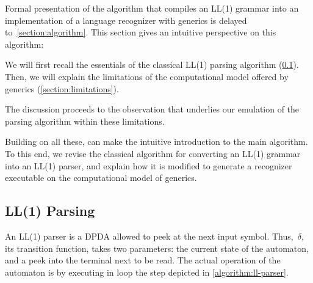 Formal presentation of the algorithm that compiles an LL(1) grammar into an implementation of a
  language recognizer with \Java generics
  is delayed to~\cref{section:algorithm}.
This section gives an intuitive perspective on this algorithm:

We will first recall the essentials of the classical LL(1) parsing algorithm (\cref{section:essentials}).
Then, we will explain the limitations of the computational model
  offered by \Java generics (\cref{section:limitations}).

The discussion proceeds to the observation
  that underlies our emulation of the parsing algorithm
  within these limitations.

Building on all these,  can
  make the intuitive introduction to the main algorithm.
To this end, we revise the classical algorithm for converting
  an LL(1) grammar into an LL(1) parser, and explain
  how it is modified to generate a recognizer executable
  on the computational model of \Java generics.

\subsection{LL(1) Parsing}
\label{section:essentials}
An LL(1) parser is a DPDA allowed to peek at the next input symbol.
Thus,~$δ$, its transition function, takes two parameters: the current
  state of the automaton, and a peek into the terminal next to be read.
The actual operation of the automaton is by executing in loop the step
  depicted in \cref{algorithm:ll-parser}.

